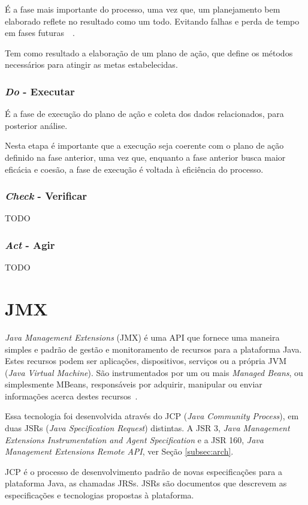 É a fase mais importante do processo, uma vez que, um planejamento bem elaborado reflete no resultado como um todo. Evitando falhas e perda de tempo em fases futuras~\cite{fabio2003}~\cite{erc}.

Tem como resultado a elaboração de um plano de ação, que define os métodos necessários para atingir as metas estabelecidas.

\subsubsection{\textit{Do} - Executar}
É a fase de execução do plano de ação e coleta dos dados relacionados, para posterior análise.

Nesta etapa é importante que a execução seja coerente com o plano de ação definido na fase anterior, uma vez que, enquanto a fase anterior busca maior eficácia e coesão, a fase de execução é voltada à eficiência do processo.

\subsubsection{\textit{Check} - Verificar}
TODO

\subsubsection{\textit{Act} - Agir}
TODO

\section{JMX}
\textit{Java Management Extensions} (JMX) é uma API que fornece uma maneira simples e padrão de gestão e monitoramento de recursos para a plataforma Java. Estes recursos podem ser aplicações, dispositivos, serviços ou a própria JVM (\textit{Java Virtual Machine}). São instrumentados por um ou mais \textit{Managed Beans}, ou simplesmente MBeans, responsáveis por adquirir, manipular ou enviar informações acerca destes recursos~\cite{lindfors2002jmx}.

Essa tecnologia foi desenvolvida através do JCP (\textit{Java Community Process}), em duas JSRs (\textit{Java Specification Request}) distintas. A JSR 3, \textit{Java Management Extensions Instrumentation and Agent Specification} e a JSR 160, \textit{Java Management Extensions Remote API}, ver Seção \ref{subsec:arch}.

JCP é o processo de desenvolvimento padrão de novas especificações para a plataforma Java, as chamadas JRSs. JSRs são documentos que descrevem as especificações e tecnologias propostas à plataforma.

